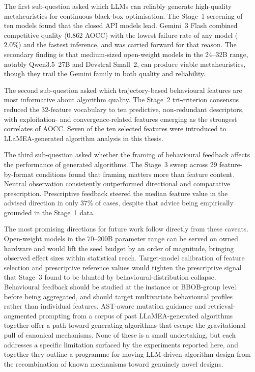 The first sub-question asked which LLMs can reliably generate high-quality metaheuristics for continuous black-box optimisation. The Stage~1 screening of ten models found that the closed API models lead. Gemini~3 Flash combined competitive quality ($0.862$ AOCC) with the lowest failure rate of any model ($2.0\%$) and the fastest inference, and was carried forward for that reason. The secondary finding is that medium-sized open-weight models in the 24--32B range, notably Qwen3.5~27B and Devstral Small~2, can produce viable metaheuristics, though they trail the Gemini family in both quality and reliability.

The second sub-question asked which trajectory-based behavioural features are most informative about algorithm quality. The Stage~2 tri-criterion consensus reduced the 32-feature vocabulary to ten predictive, non-redundant descriptors, with exploitation- and convergence-related features emerging as the strongest correlates of AOCC. Seven of the ten selected features were introduced to LLaMEA-generated algorithm analysis in this thesis.

The third sub-question asked whether the framing of behavioural feedback affects the performance of generated algorithms. The Stage~3 sweep across 29 feature-by-format conditions found that framing matters more than feature content. Neutral observation consistently outperformed directional and comparative prescription. Prescriptive feedback steered the median feature value in the advised direction in only $37\%$ of cases, despite that advice being empirically grounded in the Stage~1 data.

The most promising directions for future work follow directly from these caveats. Open-weight models in the 70--200B parameter range can be served on owned hardware and would lift the seed budget by an order of magnitude, bringing observed effect sizes within statistical reach. Target-model calibration of feature selection and prescriptive reference values would tighten the prescriptive signal that Stage~3 found to be blunted by behavioural-distribution collapse. Behavioural feedback should be studied at the instance or BBOB-group level before being aggregated, and should target multivariate behavioural profiles rather than individual features. AST-aware mutation guidance and retrieval-augmented prompting from a corpus of past LLaMEA-generated algorithms together offer a path toward generating algorithms that escape the gravitational pull of canonical mechanisms. None of these is a small undertaking, but each addresses a specific limitation surfaced by the experiments reported here, and together they outline a programme for moving LLM-driven algorithm design from the recombination of known mechanisms toward genuinely novel designs.
